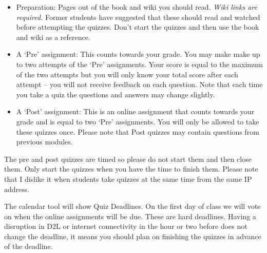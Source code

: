 \documentclass[letterpaper,10pt]{article}
\begin{document}
\begin{itemize}
\item Preparation: Pages out of the book and wiki you should read.
  \emph{Wiki links are required.}  Former students have suggested that these should read and watched before attempting the quizzes.  Don't start the quizzes and then use the book and wiki as a reference.
  
\item A `Pre' assignment: This counts towards your grade.
  You may make make up to two attempts of the `Pre' assignments.  
  Your score is equal
  to the maximum of the two attempts but you will only know your total score after each attempt -- you will not receive feedback on each question. Note that each time you take a quiz the questions and answers may change slightly.

\item A `Post' assignment: This is an online assignment that counts
  towards your grade and is equal to two `Pre' assignments.  You will
  only be allowed to take these quizzes once.  Please note that Post quizzes may contain questions from previous modules.

 
\end{itemize}

 The pre and post quizzes are timed so please do not start them and
  then close them.  Only start the quizzes when you have the time to
  finish them.  Please note that I dislike it when students take
  quizzes at the same time from the same IP address.






The calendar tool will show Quiz Deadlines. On the first day of class we will vote on when the online assignments will be due.  These are hard deadlines.  Having a disruption in D2L or internet connectivity in the hour or two before does not change the deadline, it means you should plan on finishing the quizzes in advance of the deadline.

  
\end{document}
